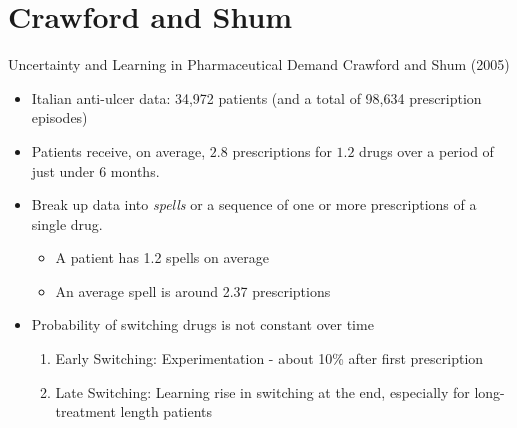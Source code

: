 \documentclass[xcolor=pdftex,dvipsnames,table,mathserif]{beamer}
\begin{document}
\section*{Crawford and Shum}

\begin{frame}{Uncertainty and Learning in Pharmaceutical Demand}
Crawford and Shum (2005)
\begin{itemize}
\item  Italian anti-ulcer data: 34,972 patients (and a total of 98,634 prescription episodes)
\item Patients receive, on average, $2.8$ prescriptions for $1.2$ drugs over a period of just under 6 months.
\item Break up data into \textit{spells} or a sequence of one or more prescriptions of a single drug.
\begin{itemize}
\item A patient has 1.2 spells on average
\item An average spell is around 2.37 prescriptions
\end{itemize}
\item Probability of switching drugs is not constant over time
\begin{enumerate}
\item Early Switching: \alert{Experimentation} - about 10\% after first prescription
\item Late Switching: \alert{Learning} rise in switching at the end, especially for long-treatment length patients
\end{enumerate}
\end{itemize}
\end{frame}
\end{document}
